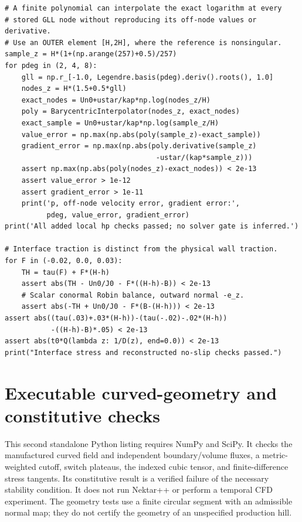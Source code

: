 \documentclass[11pt,a4paper]{article}
\numberwithin{equation}{section}
\begin{document}
\begin{lstlisting}[style=py]
# A finite polynomial can interpolate the exact logarithm at every
# stored GLL node without reproducing its off-node values or derivative.
# Use an OUTER element [H,2H], where the reference is nonsingular.
sample_z = H*(1+(np.arange(257)+0.5)/257)
for pdeg in (2, 4, 8):
    gll = np.r_[-1.0, Legendre.basis(pdeg).deriv().roots(), 1.0]
    nodes_z = H*(1.5+0.5*gll)
    exact_nodes = Un0+ustar/kap*np.log(nodes_z/H)
    poly = BarycentricInterpolator(nodes_z, exact_nodes)
    exact_sample = Un0+ustar/kap*np.log(sample_z/H)
    value_error = np.max(np.abs(poly(sample_z)-exact_sample))
    gradient_error = np.max(np.abs(poly.derivative(sample_z)
                                    -ustar/(kap*sample_z)))
    assert np.max(np.abs(poly(nodes_z)-exact_nodes)) < 2e-13
    assert value_error > 1e-12
    assert gradient_error > 1e-11
    print('p, off-node velocity error, gradient error:',
          pdeg, value_error, gradient_error)
print('All added local hp checks passed; no solver gate is inferred.')

# Interface traction is distinct from the physical wall traction.
for F in (-0.02, 0.0, 0.03):
    TH = tau(F) + F*(H-h)
    assert abs(TH - Un0/J0 - F*((H-h)-B)) < 2e-13
    # Scalar conormal Robin balance, outward normal -e_z.
    assert abs(-TH + Un0/J0 - F*(B-(H-h))) < 2e-13
assert abs((tau(.03)+.03*(H-h))-(tau(-.02)-.02*(H-h))
           -((H-h)-B)*.05) < 2e-13
assert abs(t0*Q(lambda z: 1/D(z), end=0.0)) < 2e-13
print("Interface stress and reconstructed no-slip checks passed.")

\end{lstlisting}

\section{Executable curved-geometry and constitutive checks}
\label{app:curve-stability-checks}
This second standalone Python listing requires NumPy and SciPy.
It checks the manufactured curved field and independent boundary/volume
fluxes, a metric-weighted cutoff, switch plateaus, the indexed cubic
tensor, and finite-difference stress tangents. Its constitutive result
is a verified failure of the necessary stability condition. It does
not run Nektar++ or perform a temporal CFD experiment. The geometry
tests use a finite circular segment with an admissible normal map;
they do not certify the geometry of an unspecified production hill.
\end{document}

